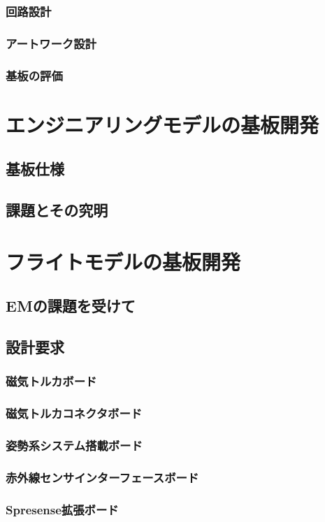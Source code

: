 \subsubsection{回路設計}
\subsubsection{アートワーク設計}
\subsubsection{基板の評価}

\section{エンジニアリングモデルの基板開発}
\subsection{基板仕様}
\subsection{課題とその究明}


\section{フライトモデルの基板開発}
\subsection{EMの課題を受けて}
\subsection{設計要求}
\subsubsection{磁気トルカボード}
\subsubsection{磁気トルカコネクタボード}
\subsubsection{姿勢系システム搭載ボード}
\subsubsection{赤外線センサインターフェースボード}
\subsubsection{Spresense拡張ボード}


